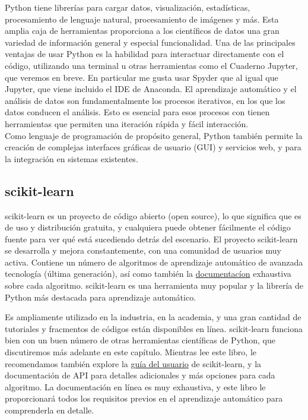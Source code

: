 Python tiene librerías  para cargar datos, visualización, estadísticas, procesamiento de lenguaje natural, procesamiento de imágenes y más. Esta amplia caja de herramientas proporciona a los científicos de datos una gran variedad de información general y especial funcionalidad. Una de las principales ventajas de usar Python es la habilidad para  interactuar directamente con el código, utilizando una terminal u otras herramientas como el Cuaderno Jupyter, que veremos en breve. En particular me gusta usar Spyder que al igual que Jupyter, que viene incluido el  IDE de Anaconda.
El aprendizaje automático y el análisis de datos son fundamentalmente los procesos  iterativos, en los que los datos conducen el análisis. Esto es esencial para esos procesos con tienen herramientas que permiten una iteración rápida y fácil interacción. \\


Como lenguaje de programación de propósito general, Python también permite la creación de  complejas interfaces gráficas de usuario (GUI) y servicios web, y para la integración en sistemas existentes.\\




\subsection{scikit-learn}
              
scikit-learn es un proyecto de código abierto (open source), lo que significa que es de uso y distribución gratuita, y cualquiera puede obtener fácilmente el código fuente para ver qué está sucediendo detrás del escenario.  El proyecto scikit-learn  se desarrolla y mejora constantemente, con una comunidad de usuarios muy activa. Contiene un número de algoritmos de aprendizaje automático de avanzada tecnología  (última generación), así como también la {\href{https://scikit-learn.org/stable/index.html}{\color{vino}    documentacíon}}  exhaustiva sobre cada algoritmo.  scikit-learn es una herramienta muy popular y la librería  de Python más destacada para aprendizaje automático. 

Es ampliamente utilizado en la industria, en la academia, y una gran cantidad de tutoriales y fracmentos de  códigos están disponibles en línea. scikit-learn funciona bien con un buen número de otras herramientas científicas de Python, que discutiremos más adelante en este capítulo.
Mientras lee este libro, le recomendamos  también explore la  \href{https://scikit-learn.org/stable/user_guide.html}{\color{vino} guía del usuario}   de scikit-learn,  y la documentación de API para detalles adicionales y  más opciones para cada
algoritmo. La documentación en línea es muy exhaustiva, y este libro le proporcionará todos los requisitos previos en el aprendizaje automático para comprenderla en detalle.

